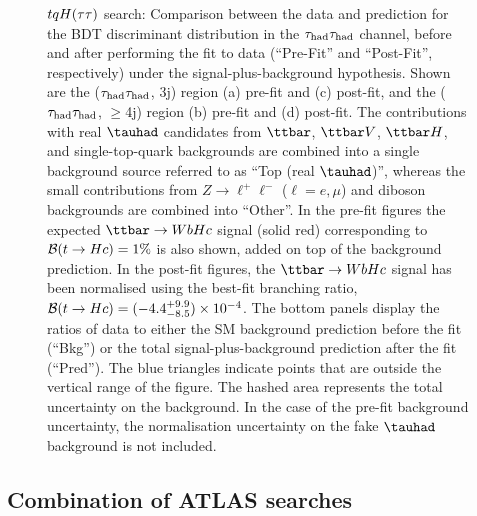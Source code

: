 \begin{figure}[htbp]
\begin{center}
\caption{\small{$tqH(\tau\tau)$ search: Comparison between the data and prediction for the BDT discriminant distribution in the 
$\tau_{\mathrm{had}} \tau_{\mathrm{had}}$ channel, before and after performing the fit to data  (``Pre-Fit'' and ``Post-Fit'', respectively) under the signal-plus-background hypothesis.
Shown are the ($\tau_{\mathrm{had}} \tau_{\mathrm{had}}$, 3j) region (a) pre-fit and (c) post-fit, and the ($\tau_{\mathrm{had}} \tau_{\mathrm{had}}$, $\geq$4j) region (b) pre-fit and (d) post-fit.
The contributions with real $\tauhad$ candidates from $\ttbar$,  $\ttbar V$, $\ttbar H$, and single-top-quark backgrounds are combined into
a single background source referred to as ``Top (real $\tauhad$)'', whereas the small contributions from 
$Z\to \ell^+\ell^-$ ($\ell = e, \mu$) and diboson backgrounds are combined into ``Other''. 
In the pre-fit figures the expected $\Hc$ signal (solid red) corresponding to $\mathcal{B}(t\to Hc)=1\%$ is also shown,
added on top of the background prediction. In the post-fit figures, the $\Hc$ signal has been normalised using the best-fit branching ratio, 
$\mathcal{B}(t\to Hc)=(-4.4^{+9.9}_{-8.5})\times 10^{-4}$.
The bottom panels display the ratios of data to either the SM background prediction before the fit (``Bkg'')  or the total signal-plus-background
prediction after the fit (``Pred''). 
The blue triangles indicate points that are outside the vertical range of the figure. 
The hashed area represents the total uncertainty on the background. 
In the case of the pre-fit background uncertainty, the normalisation uncertainty on the fake $\tauhad$ background is not included.}}
\label{fig:prepostfit_unblinded_WbHc_hh}
\end{center}
\end{figure}

\subsection{Combination of ATLAS searches}
\label{sec:results_combo}


